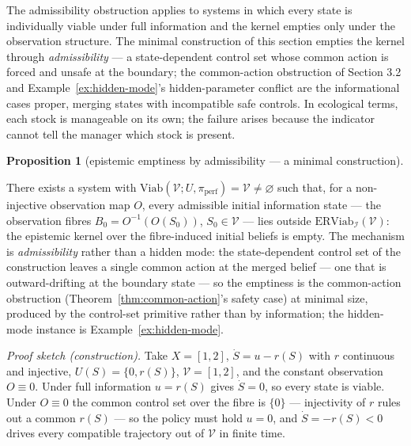 \documentclass[10pt,twocolumn]{article}
\theoremstyle{definition}
\newtheorem{proposition}{Proposition}
\begin{document}
The admissibility obstruction applies to systems in which every state is
individually viable under full information and the kernel empties only under the observation structure.
The minimal construction of this section empties the kernel through
\emph{admissibility} --- a state-dependent control set whose common
action is forced and unsafe at the boundary; the common-action
obstruction of Section 3.2 and Example~\ref{ex:hidden-mode}'s hidden-parameter
conflict are the informational cases proper, merging states with
incompatible safe controls. In ecological terms, each stock is manageable on its own; the failure arises because the indicator cannot tell the manager which stock is present.

\begin{proposition}[epistemic emptiness by admissibility --- a minimal construction]\label{prop:emptiness}

There exists a system with
\(\mathrm{Viab}(\mathcal{V}; U, \pi_{\mathrm{perf}}) = \mathcal{V} \neq \varnothing\)
such that, for a non-injective observation map \(O\), every admissible
initial information state --- the observation fibres
\(B_0 = O^{-1}(O(S_0))\), \(S_0 \in \mathcal{V}\) --- lies outside
\(\mathrm{ERViab}_{\mathcal{I}}(\mathcal{V})\): the epistemic kernel
over the fibre-induced initial beliefs is empty. The mechanism is \emph{admissibility} rather than a hidden mode: the
state-dependent control set of the construction leaves a single common
action at the merged belief --- one that is outward-drifting at the
boundary state --- so the emptiness is the common-action obstruction
(Theorem~\ref{thm:common-action}'s safety case) at minimal size, produced by the control-set primitive rather than by information; the
hidden-mode instance is Example~\ref{ex:hidden-mode}.

\end{proposition}

\emph{Proof sketch (construction).} Take \(X = [1,2]\), \(\dot S = u - r(S)\) with \(r\) continuous and injective, \(U(S) = \{0, r(S)\}\), \(\mathcal{V} = [1,2]\), and the constant observation \(O \equiv 0\). Under full information \(u = r(S)\) gives \(\dot S = 0\), so every state is viable. Under \(O \equiv 0\) the common control set over the fibre is \(\{0\}\) --- injectivity of \(r\) rules out a common \(r(S)\) --- so the policy must hold \(u = 0\), and \(\dot S = -r(S) < 0\) drives every compatible trajectory out of \(\mathcal{V}\) in finite time.
\end{document}
